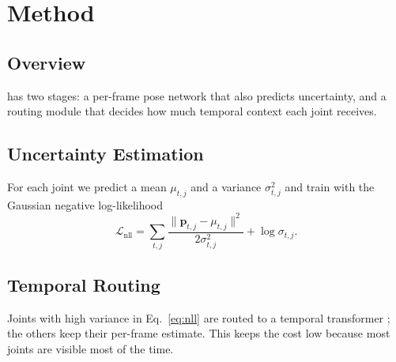 \section{Method}
\label{sec:method}

\subsection{Overview}
\method{} has two stages: a per-frame pose network that also predicts
uncertainty, and a routing module that decides how much temporal context each
joint receives.

\subsection{Uncertainty Estimation}
\label{sec:uncertainty}
For each joint we predict a mean $\mu_{t,j}$ and a variance $\sigma^2_{t,j}$ and
train with the Gaussian negative log-likelihood
\begin{equation}
  \mathcal{L}_{\text{nll}} = \sum_{t,j} \frac{\lVert \mathbf{p}_{t,j} - \mu_{t,j} \rVert^2}{2\sigma^2_{t,j}} + \log \sigma_{t,j}.
  \label{eq:nll}
\end{equation}

\subsection{Temporal Routing}
\label{sec:routing}
Joints with high variance in Eq.~\eqref{eq:nll} are routed to a temporal
transformer \citep{vaswani2017attention}; the others keep their per-frame
estimate. This keeps the cost low because most joints are visible most of the
time.
